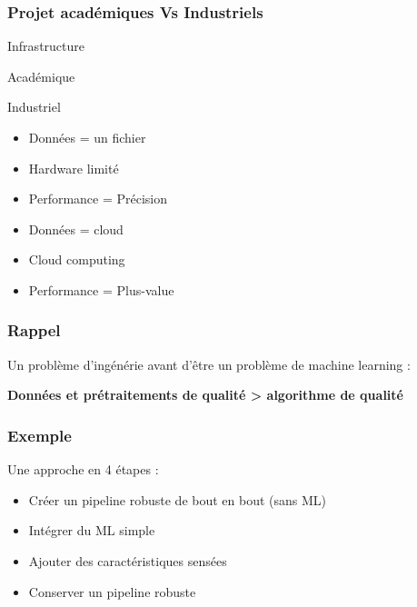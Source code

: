 \begin{frame}
  \frametitle{Projet académiques Vs Industriels}
  \begin{center}
    Infrastructure
  \end{center}
  \begin{minipage}[c]{0.49\linewidth}
    \begin{center}
      Académique
      \newline
    \end{center}
  \end{minipage}\hfill
  \begin{minipage}[c]{0.49\linewidth}
    \begin{center}
      Industriel
      \newline
    \end{center}
  \end{minipage}\hfill
  \begin{minipage}[c]{0.49\linewidth}
    \begin{itemize}
    \item Données = un fichier
    \item Hardware limité
    \item Performance = Précision
    \end{itemize}
  \end{minipage}\hfill
  \vrule{}
  \begin{minipage}[c]{0.49\linewidth}
    \begin{itemize}
    \item Données = cloud
    \item Cloud computing
    \item Performance = Plus-value
    \end{itemize}
  \end{minipage}\hfill
\end{frame}

\begin{frame}
  \frametitle{Rappel}
  Un problème d'ingénérie avant d'être un problème de machine learning : \\
  \begin{center}
    \textbf{Données et prétraitements de qualité > algorithme de qualité}
  \end{center}
\end{frame}

\begin{frame}
  \frametitle{Exemple}
  Une approche en 4 étapes :
  \begin{itemize}
  \item Créer un pipeline robuste de bout en bout (sans ML)
  \item Intégrer du ML simple
  \item Ajouter des caractéristiques sensées
  \item Conserver un pipeline robuste
  \end{itemize}
\end{frame}

